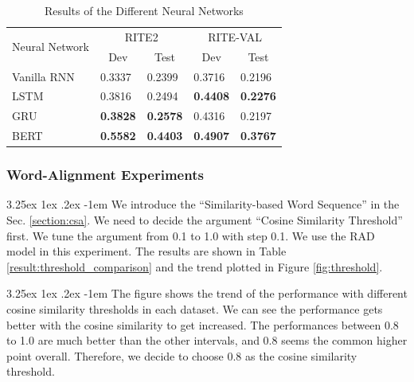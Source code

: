\documentclass[12pt]{article}
\makeatletter
\renewcommand\paragraph{\@startsection{paragraph}{5}{\z@}%
  {3.25ex \@plus1ex \@minus.2ex}%
  {-1em}%
  {\normalfont\normalsize\bfseries}}
\makeatother
\begin{document}
\begin{CJK*}{UTF8}{bkai}
\begin{spacing}{1.77}
\begin{table}[H]
  \centering
  \setlength{\extrarowheight}{-3pt}
  \caption{Results of the Different Neural Networks}
  \label{result:rnn_types}
  \begin{tabular}{|l|l|l|l|l|}
  \hline
  \multirow{2}{*}{Neural Network} & \multicolumn{2}{c|}{RITE2} & \multicolumn{2}{c|}{RITE-VAL} \\ \cline{2-5}
   & \multicolumn{1}{c|}{Dev} & \multicolumn{1}{c|}{Test} & \multicolumn{1}{c|}{Dev} & \multicolumn{1}{c|}{Test} \\ \hline
  Vanilla RNN & 0.3337 & 0.2399 & 0.3716 & 0.2196 \\ \hline
  LSTM & 0.3816 & 0.2494 & \textbf{0.4408} & \textbf{0.2276} \\ \hline
  GRU & \textbf{0.3828} & \textbf{0.2578} & 0.4316 & 0.2197 \\ \hline
  BERT & \textbf{0.5582} & \textbf{0.4403} & \textbf{0.4907} & \textbf{0.3767} \\ \hline
  \end{tabular}
\end{table}

\subsubsection{Word-Alignment Experiments}
\paragraph{}
We introduce the ``Similarity-based Word Sequence'' in the Sec. \ref{section:csa}. We need to decide the argument ``Cosine Similarity Threshold'' first. We tune the argument from 0.1 to 1.0 with step 0.1. We use the RAD model in this experiment. The results are shown in Table \ref{result:threshold_comparison} and the trend plotted in Figure \ref{fig:threshold}.

\paragraph{}
The figure shows the trend of the performance with different cosine similarity thresholds in each dataset. We can see the performance gets better with the cosine similarity to get increased. The performances between 0.8 to 1.0 are much better than the other intervals, and 0.8 seems the common higher point overall. Therefore, we decide to choose 0.8 as the cosine similarity threshold.


\end{spacing}
\end{CJK*}
\end{document}
